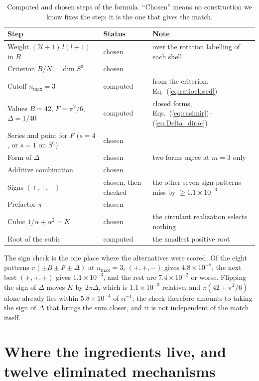 \documentclass[aps,prl,twocolumn,superscriptaddress]{revtex4-2}
\begin{document}
\begin{table}[tp]
\centering
\begin{tabular}{p{}p{}p{}}
\hline\hline
Step & Status & Note \\
\hline
Weight $(2l+1)\,l(l+1)$ in $B$ & chosen & over the rotation labelling of each shell \\
Criterion $B/N = \dim S^3$ & chosen & \\
Cutoff $n_{\max} = 3$ & computed & from the criterion, Eq.~(\ref{eq:ratioclosed}) \\
Values $B = 42$, $F = \pi^2/6$, $\Delta = 1/40$ & computed & closed forms, Eqs.~(\ref{eq:casimir})--(\ref{eq:Delta_dirac}) \\
Series and point for $F$ ($s = 4$, or $s=1$ on $S^1$) & chosen & \\
Form of $\Delta$ & chosen & two forms agree at $m = 3$ only \\
Additive combination & chosen & \\
Signs $(+,+,-)$ & chosen, then checked & the other seven sign patterns miss by $\ge 1.1\times10^{-3}$ \\
Prefactor $\pi$ & chosen & \\
Cubic $1/\alpha + \alpha^2 = K$ & chosen & the circulant realization selects nothing \\
Root of the cubic & computed & the smallest positive root \\
\hline\hline
\end{tabular}
\caption{Computed and chosen steps of the formula. ``Chosen'' means no
construction we know fixes the step; it is the one that gives the
match.}
\label{tab:ledger}
\end{table}

The sign check is the one place where the alternatives were scored. Of
the eight patterns $\pi(\pm B \pm F \pm \Delta)$ at $n_{\max} = 3$,
$(+,+,-)$ gives $4.8\times10^{-7}$, the next best $(+,+,+)$ gives
$1.1\times10^{-3}$, and the rest are $7.4\times10^{-2}$ or worse.
Flipping the sign of $\Delta$ moves $K$ by $2\pi\Delta$, which is
$1.1\times10^{-3}$ relative, and $\pi(42 + \pi^2/6)$ alone already lies
within $5.8\times10^{-4}$ of $\alpha^{-1}$; the check therefore amounts
to taking the sign of $\Delta$ that brings the sum closer, and it is not
independent of the match itself.


\section{Where the ingredients live, and twelve eliminated
mechanisms}\label{sec:mechanisms}
\end{document}
